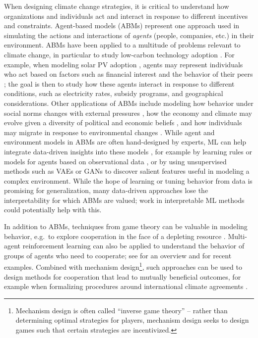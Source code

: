\documentclass[11pt]{report}
\begin{document}
When designing climate change strategies, it is critical to understand how organizations and  individuals act and interact in response to different incentives and constraints. Agent-based models (ABMs) \cite{de2014agent, 10.2307/j.ctt7rxj1} represent one approach used in simulating the actions and interactions of \emph{agents} (people, companies, etc.) in their environment. ABMs have been applied to a multitude of problems relevant to climate change, in particular to study low-carbon technology adoption \cite{RAI2015163, Haelg_2018, zhang2012agent, NOORI2016215}. 
For example, when modeling solar PV adoption \cite{Zhang2016abm}, agents may represent individuals who act based on factors such as financial interest and the behavior of their peers \cite{rai2016overcoming, bollinger2012peer}; the goal is then to study how these agents interact in response to different conditions, such as electricity rates, subsidy programs, and geographical considerations. 
Other applications of ABMs include modeling how behavior under social norms changes with external pressures \cite{doi:10.1098/rspb.2015.2431}, how the economy and climate may evolve given a diversity of political and economic beliefs \cite{geisendorf}, and how individuals may migrate in response to environmental changes \cite{thober}. While agent and environment models in ABMs are often hand-designed by experts, ML can help integrate data-driven insights into these models \cite{Zhang2019}, for example by learning rules or models for agents based on observational data \cite{Zhang2016abm, gunaratne2018evolutionary}, or by using unsupervised methods such as VAEs or GANs to discover salient features useful in modeling a complex environment. While the hope of learning or tuning behavior from data is promising for generalization, many data-driven approaches lose the interpretability for which ABMs are valued; work in interpretable ML methods could potentially help with this.

In addition to ABMs, techniques from game theory can be valuable in modeling behavior, e.g.~to explore cooperation in the face of a depleting resource \cite{hilbe2018evolution}. Multi-agent reinforcement learning can also be applied to understand the behavior of groups of agents who need to cooperate; see \cite{panait2005MARL} for an overview and \cite{lee2019imitate, jaques2018motivation} for recent examples. Combined with mechanism design\footnote{Mechanism design is often called ``inverse game theory'' -- rather than determining optimal strategies for players, mechanism design seeks to design games such that certain strategies are incentivized.}, such approaches can be used to design methods for cooperation that lead to mutually beneficial outcomes, for example when formalizing procedures around international climate agreements \cite{mechclim, Procaccia:2013:CCJ:2483852.2483870}.
\end{document}
